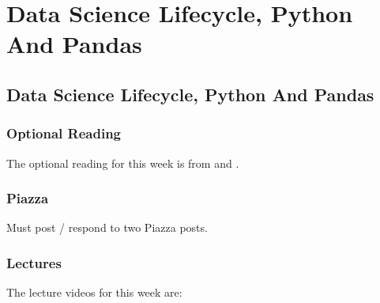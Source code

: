 \clearpage

\newcommand{\ChapTitle}{Data Science Lifecycle, Python And Pandas}
\newcommand{\SectionTitle}{Data Science Lifecycle, Python And Pandas}
\chapter{\ChapTitle}

\section{\SectionTitle}

\subsection{Optional Reading}

The optional reading for this week is from \LearnDSBook \hspace*{1pt} and \PyDSBook.

\subsection{Piazza}

Must post / respond to two Piazza posts.

\subsection{Lectures}

The lecture videos for this week are:

